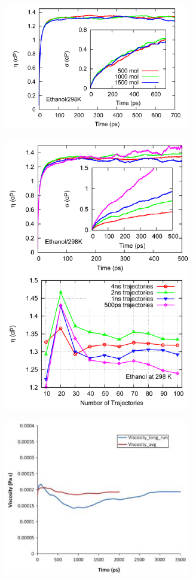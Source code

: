 \documentclass[9pt]{livecoms}
\begin{document}
\begin{figure}[htb!]
	\centering
	\includegraphics[width=3.2in]{figures/ZhangFig9.png}
	\caption{}
	\label{fig:ZhangFig9}
\end{figure}

\begin{figure}[htb!]
	\centering
	\includegraphics[width=3.2in]{figures/ZhangFig8.png}
	\caption{}
	\label{fig:ZhangFig8}
\end{figure}

\begin{figure}[htb!]
	\centering
	\includegraphics[width=3.2in]{figures/PayalFig2.png}
	\caption{}
	\label{fig:PayalFig2}
\end{figure}
\end{document}
